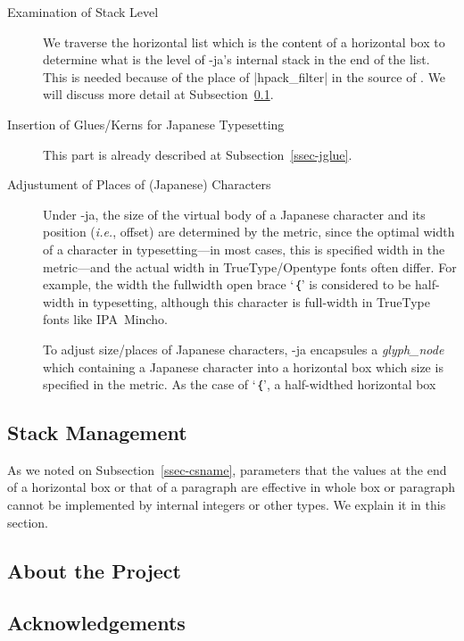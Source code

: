 \documentclass{ajt}
\begin{document}
\begin{description}
\item[Examination of Stack Level] We traverse the horizontal list which is the content of a horizontal box 
to determine what is the level of \LuaTeX-ja's internal stack in the end
	   of the list. This is needed because of the place of
	   |hpack_filter| in the source of \LuaTeX. We will discuss more detail at Subsection~\ref{ssec-stack}.

\item[Insertion of Glues/Kerns for Japanese Typesetting]
This part is already described at Subsection~\ref{ssec-jglue}. 

\item[Adjustument of Places of (Japanese) Characters]
Under \LuaTeX-ja, the size of the virtual body of a Japanese character
	   and its position (\emph{i.e.}, offset) are determined by the
	   metric, since the optimal width of a character in
	   typesetting---in most cases, this is specified width in the
	   metric---and the actual width in TrueType/Opentype fonts
	   often differ. For example, the width the fullwidth open brace
	   `\inhibitglue ｛' is considered to be half-width in
	   typesetting, although this character is full-width in
	   TrueType fonts like IPA~Mincho.

To adjust size/places of Japanese characters, \LuaTeX-ja encapsules a
	   \textit{glyph\_node} which containing a Japanese character
	   into a horizontal box which size is specified in the metric.
As the case of `\inhibitglue ｛', a half-widthed horizontal box 
\end{description}

\subsection{Stack Management}
\label{ssec-stack}

As we noted on Subsection~\ref{ssec-csname}, parameters that the values
at the end of a horizontal box or that of a paragraph are effective in
whole box or paragraph cannot be implemented by internal integers or
other types. We explain it in this section.



\subsection*{About the Project}
\subsection*{Acknowledgements}
\end{document}
